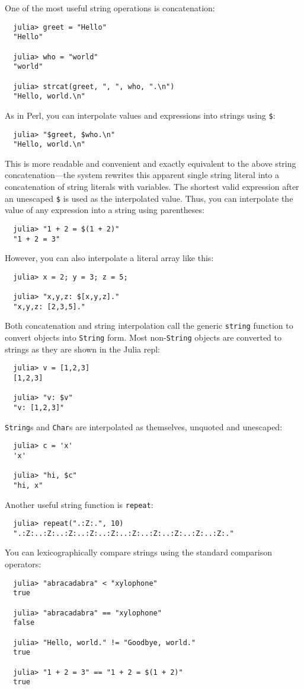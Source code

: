 \documentclass{article}
\begin{document}
One of the most useful string operations is concatenation:
\begin{verbatim}
  julia> greet = "Hello"
  "Hello"

  julia> who = "world"
  "world"

  julia> strcat(greet, ", ", who, ".\n")
  "Hello, world.\n"
\end{verbatim}
As in Perl, you can interpolate values and expressions into strings using \verb|$|:
\begin{verbatim}
  julia> "$greet, $who.\n"
  "Hello, world.\n"
\end{verbatim}
This is more readable and convenient and exactly equivalent to the above string concatenation---the system rewrites this apparent single string literal into a concatenation of string literals with variables.
The shortest valid expression after an unescaped \verb|$| is used as the interpolated value.
Thus, you can interpolate the value of any expression into a string using parentheses:
\begin{verbatim}
  julia> "1 + 2 = $(1 + 2)"
  "1 + 2 = 3"
\end{verbatim}
However, you can also interpolate a literal array like this:
\begin{verbatim}
  julia> x = 2; y = 3; z = 5;

  julia> "x,y,z: $[x,y,z]."
  "x,y,z: [2,3,5]."
\end{verbatim}
Both concatenation and string interpolation call the generic \verb|string| function to convert objects into \verb|String| form.
Most non-\verb|String| objects are converted to strings as they are shown in the Julia repl:
\begin{verbatim}
  julia> v = [1,2,3]
  [1,2,3]

  julia> "v: $v"
  "v: [1,2,3]"
\end{verbatim}
\verb|String|s and \verb|Char|s are interpolated as themselves, unquoted and unescaped:
\begin{verbatim}
  julia> c = 'x'
  'x'

  julia> "hi, $c"
  "hi, x"
\end{verbatim}
Another useful string function is \verb|repeat|:
\begin{verbatim}
  julia> repeat(".:Z:.", 10)
  ".:Z:..:Z:..:Z:..:Z:..:Z:..:Z:..:Z:..:Z:..:Z:..:Z:."
\end{verbatim}
You can lexicographically compare strings using the standard comparison operators:
\begin{verbatim}
  julia> "abracadabra" < "xylophone"
  true

  julia> "abracadabra" == "xylophone"
  false

  julia> "Hello, world." != "Goodbye, world."
  true

  julia> "1 + 2 = 3" == "1 + 2 = $(1 + 2)"
  true
\end{verbatim}
\end{document}
